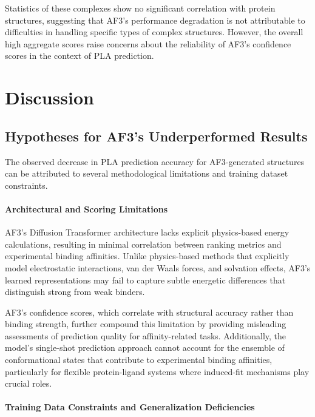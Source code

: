 \documentclass[unnumsec,webpdf,contemporary,large]{oup-authoring-template}
\theoremstyle{thmstyleone}%
\theoremstyle{thmstyletwo}%
\theoremstyle{thmstylethree}%
\begin{document}
Statistics of these complexes show no significant correlation with protein structures,
suggesting that AF3's performance degradation is not attributable to difficulties 
in handling specific types of complex structures. However, the
overall high aggregate scores raise concerns about the reliability of
AF3's confidence scores in the context of PLA prediction. 

\section{Discussion}
\subsection{Hypotheses for AF3's Underperformed Results}
The observed decrease in PLA prediction accuracy for AF3-generated structures 
can be attributed to several methodological limitations and training dataset constraints.


\paragraph{\textbf{Architectural and Scoring Limitations}}

AF3's Diffusion Transformer architecture lacks explicit physics-based energy 
calculations, resulting in minimal correlation between ranking metrics 
and experimental binding affinities. Unlike physics-based methods that 
explicitly model electrostatic interactions, van der Waals forces, and 
solvation effects, AF3's learned representations may fail to capture 
subtle energetic differences that distinguish strong from weak binders.

AF3's confidence scores, which correlate with structural accuracy rather than binding strength, 
further compound this limitation by providing misleading assessments of 
prediction quality for affinity-related tasks. Additionally, the model's 
single-shot prediction approach cannot account for the ensemble of 
conformational states that contribute to experimental binding affinities, 
particularly for flexible protein-ligand systems where induced-fit mechanisms 
play crucial roles.

\paragraph{\textbf{Training Data Constraints and Generalization Deficiencies}}
\end{document}
